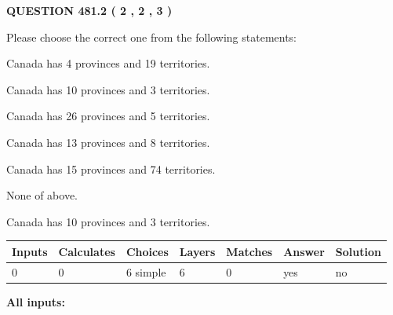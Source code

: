 \documentclass[12pt]{article}
\begin{document}
   
  
\vspace{0.2in}
  
{\textbf{\Large{QUESTION
481.2 
 ( 2 , 2 , 3 )
}}}
  
  
Please choose the correct one from the following statements:
 
 
Canada has   4 provinces and  19 territories.
 
 
Canada has 10  provinces and 3 territories.
 
 
Canada has  26 provinces and  5 territories.
 
 
Canada has  13 provinces and  8 territories.
 
 
Canada has  15 provinces and  74 territories.
 
 
 None of above.
 
 
\noindent{}
 
 
Canada has 10  provinces and 3 territories.
 
 
\noindent{}
 
 
   
   
   
   
\noindent\begin{tabular}{|l|l|l|l|l|l|l|}
 \hline
Inputs & Calculates & Choices & Layers & Matches & Answer & Solution \\ \hline
 0  & 
 0  & 
 6
  simple  
  & 
 6  & 
 0  & 
  yes & 
  no 
  \\ \hline
 \end{tabular}
   
   
   
   
\noindent{}
   
   
   
   
\noindent\vspace{0.1in}\hspace{-0.08in} {\textbf{\Large{All inputs: }}}
   
   
   
   
   
   
 \vspace{0.2in}
 
\end{document}
